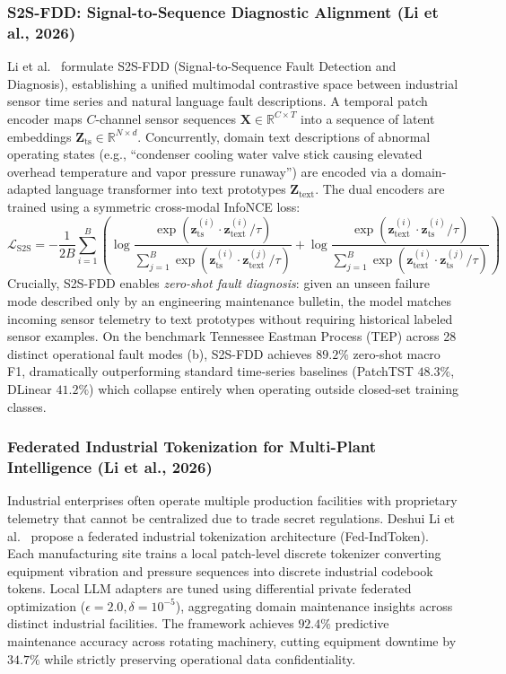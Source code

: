 \subsubsection{S2S-FDD: Signal-to-Sequence Diagnostic Alignment (Li et al., 2026)}
Li et al.~\cite{Li2026S2SFDD} formulate S2S-FDD (Signal-to-Sequence Fault Detection and Diagnosis), establishing a unified multimodal contrastive space between industrial sensor time series and natural language fault descriptions. A temporal patch encoder maps $C$-channel sensor sequences $\mathbf{X} \in \mathbb{R}^{C \times T}$ into a sequence of latent embeddings $\mathbf{Z}_{\text{ts}} \in \mathbb{R}^{N \times d}$. Concurrently, domain text descriptions of abnormal operating states (e.g., ``condenser cooling water valve stick causing elevated overhead temperature and vapor pressure runaway'') are encoded via a domain-adapted language transformer into text prototypes $\mathbf{Z}_{\text{text}}$. The dual encoders are trained using a symmetric cross-modal InfoNCE loss:
\begin{equation}
    \mathcal{L}_{\text{S2S}} = -\frac{1}{2B} \sum_{i=1}^B \left( \log \frac{\exp(\mathbf{z}_{\text{ts}}^{(i)} \cdot \mathbf{z}_{\text{text}}^{(i)} / \tau)}{\sum_{j=1}^B \exp(\mathbf{z}_{\text{ts}}^{(i)} \cdot \mathbf{z}_{\text{text}}^{(j)} / \tau)} + \log \frac{\exp(\mathbf{z}_{\text{text}}^{(i)} \cdot \mathbf{z}_{\text{ts}}^{(i)} / \tau)}{\sum_{j=1}^B \exp(\mathbf{z}_{\text{text}}^{(i)} \cdot \mathbf{z}_{\text{ts}}^{(j)} / \tau)} \right)
\end{equation}
Crucially, S2S-FDD enables \emph{zero-shot fault diagnosis}: given an unseen failure mode described only by an engineering maintenance bulletin, the model matches incoming sensor telemetry to text prototypes without requiring historical labeled sensor examples. On the benchmark Tennessee Eastman Process (TEP) across 28 distinct operational fault modes (b), S2S-FDD achieves $89.2\%$ zero-shot macro F1, dramatically outperforming standard time-series baselines (PatchTST $48.3\%$, DLinear $41.2\%$) which collapse entirely when operating outside closed-set training classes.

\subsubsection{Federated Industrial Tokenization for Multi-Plant Intelligence (Li et al., 2026)}
Industrial enterprises often operate multiple production facilities with proprietary telemetry that cannot be centralized due to trade secret regulations. Deshui Li et al.~\cite{Li2026IndustrialToken} propose a federated industrial tokenization architecture (Fed-IndToken). Each manufacturing site trains a local patch-level discrete tokenizer converting equipment vibration and pressure sequences into discrete industrial codebook tokens. Local LLM adapters are tuned using differential private federated optimization ($\epsilon=2.0, \delta=10^{-5}$), aggregating domain maintenance insights across distinct industrial facilities. The framework achieves $92.4\%$ predictive maintenance accuracy across rotating machinery, cutting equipment downtime by $34.7\%$ while strictly preserving operational data confidentiality.

